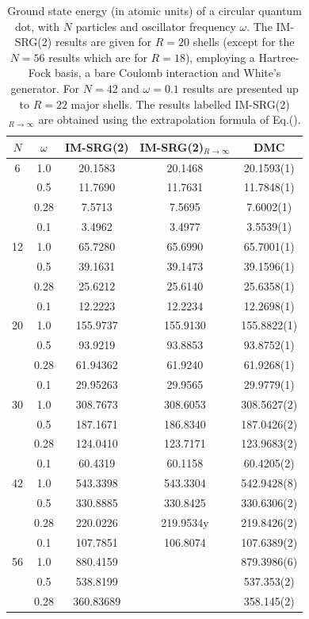 \documentclass[amsmath, amssymb, aps, floatfix, nofootinbib, preprintnumbers,showpacs, superscriptaddress, twocolumn]{revtex4-1}
\begin{document}
\begin{table}
\begin{center}
\caption{Ground state energy (in atomic units) of a circular quantum
  dot, with $N$ particles and oscillator frequency $\omega$. The
  IM-SRG(2) results are given for $R=20$ shells (except for the $N=56$
  results which are for $R=18$), employing a Hartree-Fock basis, a
  bare Coulomb interaction and White's generator. For $N=42$ and
  $\omega=0.1$ results are presented up to $R=22$ major shells. The
  results labelled IM-SRG(2)$_{R\rightarrow \infty}$ are obtained
  using the extrapolation formula of Eq.().}
\label{tab:SRGDMC-R20}
\begin{tabular}{ccccc}
\hline\hline
$N$ & $\omega$ & IM-SRG(2) &IM-SRG(2)$_{R\rightarrow \infty}$ & DMC \\
\hline
6 & 1.0 & 20.1583 & 20.1468   & 20.1593(1) \\
& 0.5&11.7690  & 11.7631 &11.7848(1) \\
& 0.28& 7.5713 &   7.5695 &7.6002(1) \\
& 0.1& 3.4962  &  3.4977 &3.5539(1)\\
\hline
12&1.0 & 65.7280 & 65.6990  & 65.7001(1) \\
&0.5 &39.1631 &  39.1473 & 39.1596(1)\\
&  0.28&25.6212 &  25.6140& 25.6358(1)\\
&  0.1&12.2223 &  12.2234 & 12.2698(1)\\
\hline
20& 1.0&155.9737 & 155.9130  & 155.8822(1)\\
&  0.5&93.9219 &   93.8853 &93.8752(1)\\
&  0.28&61.94362 & 61.9240 &61.9268(1) \\
&  0.1&29.95263 &29.9565  & 29.9779(1)\\
\hline
30& 1.0& 308.7673 & 308.6053 & 308.5627(2) \\
 & 0.5& 187.1671& 186.8340 &187.0426(2)\\
 & 0.28&124.0410 & 123.7171 & 123.9683(2) \\
 & 0.1& 60.4319& 60.1158 & 60.4205(2)\\
\hline
42& 1.0&543.3398 & 543.3304 & 542.9428(8) \\
 & 0.5&330.8885 & 330.8425 & 330.6306(2)\\
 & 0.28&220.0226 & 219.9534y &219.8426(2) \\
 & 0.1& 107.7851&  106.8074& 107.6389(2)\\
 \hline
56& 1.0& 880.4159 &  & 879.3986(6) \\
 & 0.5& 538.8199 & & 537.353(2)\\
 & 0.28&360.83689  &  & 358.145(2) \\
\hline
\end{tabular}
\end{center}
\end{table}
\end{document}
